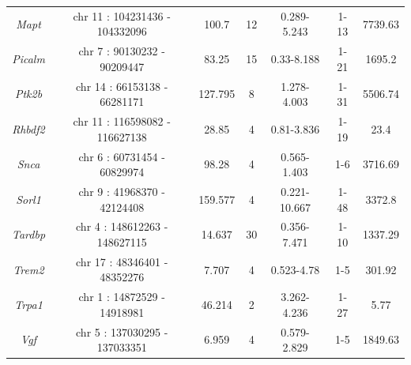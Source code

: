 \begin{table}[]
\begin{tabular}{@{}ccccccc@{}}
		\textit{Mapt}   & chr 11 : 104231436 - 104332096 & 100.7   & 12 & 0.289-5.243  & 1-13 & 7739.63  \\
		\textit{Picalm} & chr 7 : 90130232 - 90209447    & 83.25   & 15 & 0.33-8.188   & 1-21 & 1695.2   \\
		\textit{Ptk2b}  & chr 14 : 66153138 - 66281171   & 127.795 & 8  & 1.278-4.003  & 1-31 & 5506.74  \\
		\textit{Rhbdf2} & chr 11 : 116598082 - 116627138 & 28.85   & 4  & 0.81-3.836   & 1-19 & 23.4     \\
		\textit{Snca}   & chr 6 : 60731454 - 60829974    & 98.28   & 4  & 0.565-1.403  & 1-6  & 3716.69  \\
		\textit{Sorl1}  & chr 9 : 41968370 - 42124408    & 159.577 & 4  & 0.221-10.667 & 1-48 & 3372.8   \\
		\textit{Tardbp} & chr 4 : 148612263 - 148627115  & 14.637  & 30 & 0.356-7.471  & 1-10 & 1337.29  \\
		\textit{Trem2}  & chr 17 : 48346401 - 48352276   & 7.707   & 4  & 0.523-4.78   & 1-5  & 301.92   \\
		\textit{Trpa1}  & chr 1 : 14872529 - 14918981    & 46.214  & 2  & 3.262-4.236  & 1-27 & 5.77     \\
		\textit{Vgf}    & chr 5 : 137030295 - 137033351  & 6.959   & 4  & 0.579-2.829  & 1-5  & 1849.63  \\ \bottomrule
	\end{tabular}
\end{table}

